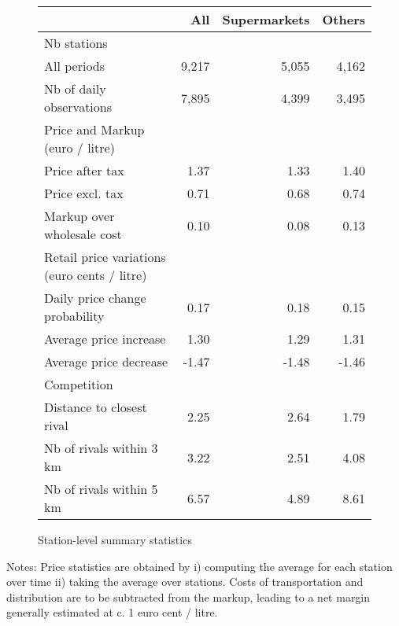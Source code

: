 \documentclass[english]{article}
\begin{document}
{{\begin{figure}[!h]
  \caption{Station-level summary statistics}
\begin{tabular}{lrrr}
\toprule
\toprule
{}                                &      All &  Supermarkets &   Others \\
\midrule
Nb stations                       &          &               &          \\
All periods                       &    9,217 &         5,055 &    4,162 \\
Nb of daily observations          &    7,895 &         4,399 &    3,495 \\
\midrule
Price and Markup (euro / litre)   &          &               &          \\
Price after tax                   &     1.37 &          1.33 &     1.40 \\
Price excl. tax                   &     0.71 &          0.68 &     0.74 \\
Markup over wholesale cost        &     0.10 &          0.08 &     0.13 \\
\midrule
Retail price variations (euro cents / litre)  &      &       &          \\
Daily price change probability    &     0.17 &          0.18 &     0.15 \\
Average price increase            &     1.30 &          1.29 &     1.31 \\
Average price decrease            &    -1.47 &         -1.48 &    -1.46 \\
\midrule
Competition                       &          &               &          \\
Distance to closest rival         &     2.25 &          2.64 &     1.79 \\
Nb of rivals within 3 km          &     3.22 &          2.51 &     4.08 \\
Nb of rivals within 5 km          &     6.57 &          4.89 &     8.61 \\
\bottomrule
\bottomrule
\end{tabular}
\label{tab:station_stats_des}
\end{figure}

Notes: Price statistics are obtained by i) computing the average for each station over time ii) taking the average over stations. Costs of transportation and distribution are to be subtracted from the markup, leading to a net margin generally estimated at c. 1 euro cent / litre.

\newpage

}}
\end{document}
